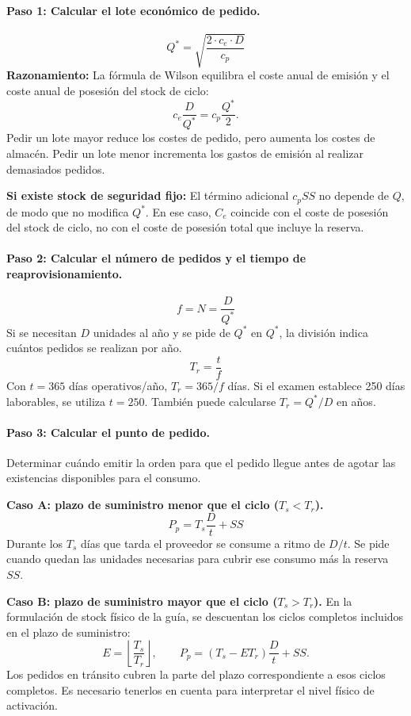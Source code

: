 \documentclass[11pt,a4paper]{article}
\begin{document}
\paragraph{Paso 1: Calcular el lote económico de pedido.}
\[
    Q^{*}=\sqrt{\frac{2\cdot c_e\cdot D}{c_p}}
\]
\textbf{Razonamiento:} La fórmula de Wilson equilibra el coste anual de emisión y el coste anual de posesión del stock de ciclo:
\[
    c_e\frac{D}{Q^{*}}=c_p\frac{Q^{*}}{2}.
\]
Pedir un lote mayor reduce los costes de pedido, pero aumenta los costes de almacén. Pedir un lote menor incrementa los gastos de emisión al realizar demasiados pedidos.

\textbf{Si existe stock de seguridad fijo:} El término adicional $c_p SS$ no depende de $Q$, de modo que no modifica $Q^{*}$. En ese caso, $C_e$ coincide con el coste de posesión del stock de ciclo, no con el coste de posesión total que incluye la reserva.

\paragraph{Paso 2: Calcular el número de pedidos y el tiempo de reaprovisionamiento.}
\[
    f=N=\frac{D}{Q^{*}}
\]
Si se necesitan $D$ unidades al año y se pide de $Q^{*}$ en $Q^{*}$, la división indica cuántos pedidos se realizan por año.
\[
    T_r=\frac{t}{f}
\]
Con $t=365$ días operativos/año, $T_r=365/f$ días. Si el examen establece 250 días laborables, se utiliza $t=250$. También puede calcularse $T_r=Q^{*}/D$ en años.

\paragraph{Paso 3: Calcular el punto de pedido.}
Determinar cuándo emitir la orden para que el pedido llegue antes de agotar las existencias disponibles para el consumo.

\textbf{Caso A: plazo de suministro menor que el ciclo ($T_s<T_r$).}
\[
    P_p=T_s\frac{D}{t}+SS
\]
Durante los $T_s$ días que tarda el proveedor se consume a ritmo de $D/t$. Se pide cuando quedan las unidades necesarias para cubrir ese consumo más la reserva $SS$.

\textbf{Caso B: plazo de suministro mayor que el ciclo ($T_s>T_r$).}
En la formulación de stock físico de la guía, se descuentan los ciclos completos incluidos en el plazo de suministro:
\[
    E=\left\lfloor\frac{T_s}{T_r}\right\rfloor,\qquad
    P_p=(T_s-E T_r)\frac{D}{t}+SS.
\]
Los pedidos en tránsito cubren la parte del plazo correspondiente a esos ciclos completos. Es necesario tenerlos en cuenta para interpretar el nivel físico de activación.
\end{document}
